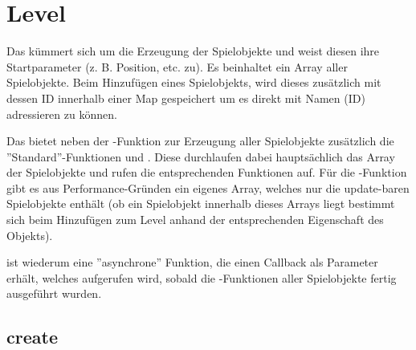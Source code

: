 \chapter{Level}

Das  kümmert sich um die Erzeugung der Spielobjekte und weist diesen ihre Startparameter (z. B. Position, etc. zu). Es beinhaltet ein Array aller Spielobjekte. Beim Hinzufügen eines Spielobjekts, wird dieses zusätzlich mit dessen ID innerhalb einer Map gespeichert um es direkt mit Namen (ID) adressieren zu können.

Das  bietet neben der -Funktion zur Erzeugung aller Spielobjekte zusätzlich die ''Standard''-Funktionen  und . Diese durchlaufen dabei hauptsächlich das Array der Spielobjekte und rufen die entsprechenden Funktionen auf. Für die -Funktion gibt es aus Performance-Gründen ein eigenes Array, welches nur die update-baren Spielobjekte enthält (ob ein Spielobjekt innerhalb dieses Arrays liegt bestimmt sich beim Hinzufügen zum Level anhand der entsprechenden Eigenschaft des Objekts).

 ist wiederum eine ''asynchrone'' Funktion, die einen Callback als Parameter erhält, welches aufgerufen wird, sobald die -Funktionen aller Spielobjekte fertig ausgeführt wurden. 

\section{create}

